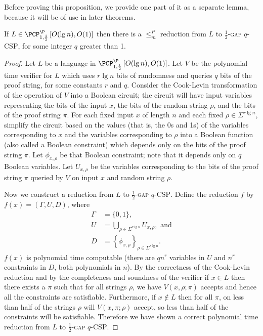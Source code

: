 \documentclass[]{article}
\newcommand{\PCPcs}[5]{\PCP^{#1}_{#2, #3}\left[#4, #5\right]}
\begin{document}
Before proving this proposition, we provide one part of it as a separate lemma, because it will be of use in later theorems.

\begin{lemma}\label{lem:constraintsp}
  If $L \in \PCPcs{\P}{1}{\frac{1}{2}}{O(\lg n)}{O(1)}$ then there is a $\leq_m^P$ reduction from $L$ to \textsc{$\frac{1}{2}$-gap $q$-CSP}, for some integer $q$ greater than 1.
\end{lemma}
\begin{proof}
  Let $L$ be a language in $\PCPcs{\P}{1}{\frac{1}{2}}{O(\lg n)}{O(1)}$.
  Let $V$ be the polynomial time \PCP{} verifier for $L$ which uses $r \lg n$ bits of randomness and queries $q$ bits of the proof string, for some constants $r$ and $q$.
  Consider the Cook-Levin transformation of the operation of $V$ into a Boolean circuit; the circuit will have input variables representing the bits of the input $x$, the bits of the random string $\rho$, and the bits of the proof string $\pi$.
  For each fixed input $x$ of length $n$ and each fixed $\rho \in \Sigma^{r \lg n}$, simplify the circuit based on the values (that is, the 0s and 1s) of the variables corresponding to $x$ and the variables corresponding to $\rho$ into a Boolean function (also called a Boolean constraint) which depends only on the bits of the proof string $\pi$.
  Let $\phi_{x, \rho}$ be that Boolean constraint; note that it depends only on $q$ Boolean variables.
  Let $U_{x, \rho}$ be the variables corresponding to the bits of the proof string $\pi$ queried by $V$ on input $x$ and random string $\rho$.

  Now we construct a reduction from $L$ to \textsc{$\frac{1}{2}$-gap $q$-CSP}.
  Define the reduction $f$ by $f(x) = (\Gamma, U, D)$, where
  \begin{align*}
    \Gamma & = \{0, 1\}, \\
    U & = \bigcup_{\rho \in \Sigma^{r \lg n}}{U_{x, \rho}}, \text{ and} \\
    D & = \left\{\phi_{x, \rho}\right\}_{\rho \in \Sigma^{r \lg n}}.
  \end{align*}
  $f(x)$ is polynomial time computable (there are $qn^r$ variables in $U$ and $n^r$ constraints in $D$, both polynomials in $n$).
  By the correctness of the Cook-Levin reduction and by the completeness and soundness of the \PCP{} verifier if $x \in L$ then there exists a $\pi$ such that for all strings $\rho$, we have $V(x, \rho; \pi)$ accepts and hence all the constraints are satisfiable.
  Furthermore, if $x \notin L$ then for all $\pi$, on less than half of the strings $\rho$ will $V(x, \pi; \rho)$ accept, so less than half of the constraints will be satisfiable.
  Therefore we have shown a correct polynomial time reduction from $L$ to \textsc{$\frac{1}{2}$-gap $q$-CSP}.
\end{proof}
\end{document}
